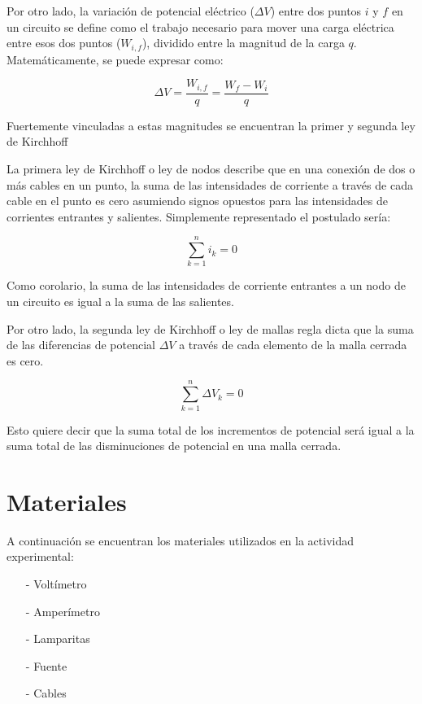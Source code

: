 \documentclass{article}
\begin{document}
Por otro lado, la variación de potencial eléctrico ($\Delta V$) entre dos puntos $i$ y $f$ en un circuito se define como el trabajo necesario para mover una carga eléctrica entre esos dos puntos ($W_{i,f}$), dividido entre la magnitud de la carga $q$. Matemáticamente, se puede expresar como:

\begin{equation}
\label{eq:Variación Potencial Eléctrico}
\Delta V=\frac{W_{i, f}}{q}=\frac{W_f - W_i}{q}
\end{equation}

Fuertemente vinculadas a estas magnitudes se encuentran la primer y segunda ley de Kirchhoff

La primera ley de Kirchhoff o ley de nodos describe que en una conexión de dos o más cables en un punto, la suma de las intensidades de corriente a través de cada cable en el punto es cero asumiendo signos opuestos para las intensidades de corrientes entrantes y salientes. Simplemente representado el postulado sería:

\begin{equation}
\label{eq:1a Ley}
\sum_{k=1}^{n} i_k = 0
\end{equation}

Como corolario, la suma de las intensidades de corriente entrantes a un nodo de un circuito es igual a la suma de las salientes.

Por otro lado, la segunda ley de Kirchhoff o ley de mallas regla dicta que la suma de las diferencias de potencial $\Delta V$ a través de cada elemento de la malla cerrada es cero.

\begin{equation}
\label{eq:2a Ley}
\sum_{k=1}^{n} \Delta V_k = 0
\end{equation}

Esto quiere decir que la suma total de los incrementos de potencial será igual a la suma total de las disminuciones de potencial en una malla cerrada.

\section{Materiales}

A continuación se encuentran los materiales utilizados en la actividad experimental:

\begin{itemize}
  \item[-] Voltímetro
  \item[-] Amperímetro
  \item[-] Lamparitas
  \item[-] Fuente
  \item[-] Cables
\end{itemize}
\end{document}

